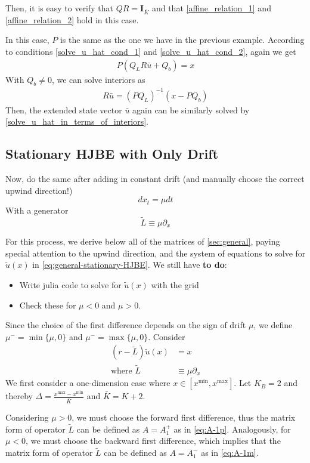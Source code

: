 \documentclass[11pt]{article}
\newcommand{\D}[1][]{\ensuremath{\partial_{#1}}}
\begin{document}
Then, it is easy to verify that $Q  R = \mathbf{I}_{\bar{K}}$ and that \eqref{affine_relation_1} and \eqref{affine_relation_2} hold in this case.

In this case, $P$ is the same as the one we have in the previous example. According to conditions \eqref{solve_u_hat_cond_1} and \eqref{solve_u_hat_cond_2}, again we get
\begin{align}
P(Q_L R \bar{u}+Q_b) = x
\end{align}
With $Q_b\neq 0$, we can solve interiors as
\begin{align}
R\bar{u} = (P Q_L)^{-1}(x-P Q_b)
\end{align}
Then, the extended state vector $\bar{u}$ again can be similarly solved by \eqref{solve_u_hat_in_terms_of_interiors}.
\subsection{Stationary HJBE with Only Drift}
Now, do the same after adding in constant drift (and manually choose the correct upwind direction!)
$$
d x_t = \mu dt
$$
With a generator
$$
	\tilde{L} \equiv \mu \D[x]
$$

For this process, we derive below all of the matrices of \cref{sec:general}, paying special attention to the upwind direction, and the system of equations to solve for $\tilde{u}(x)$ in \cref{eq:general-stationary-HJBE}. We still have \textbf{to do}:
\begin{itemize}
	\item Write julia code to solve for $\tilde{u}(x)$ with the grid
	\item Check these for $\mu < 0$ and $\mu > 0$.
\end{itemize}

Since the choice of the first difference depends on the sign of drift $\mu$, we define $\mu^- =\min\{\mu, 0\}$ and $\mu^- =\max\{\mu, 0\}$.
Consider
\begin{align}
(r - \tilde{L} )\tilde{u}(x) &= x\label{HJBE_PDE_with_drifts}\\
\text{where }\tilde{L}&\equiv \mu\partial_{x}
\end{align}
We first consider a one-dimension case where $x\in [x^{\min},x^{\max}]$. Let $K_B = 2$ and thereby $\Delta  = \frac{x^{\max}-x^{\min}}{\bar{K}}$ and $\bar{K} = K+2$.

Considering $\mu>0$, we must choose the forward first difference, thus the matrix form of operator $\tilde{L}$ can be defined as $A = A_1^+$ as in \eqref{eq:A-1p}. Analogously, for $\mu<0$, we must choose the backward first difference, which implies that the matrix form of operator $\tilde{L}$ can be defined as $A = A_1^-$ as in \eqref{eq:A-1m}.
\end{document}
